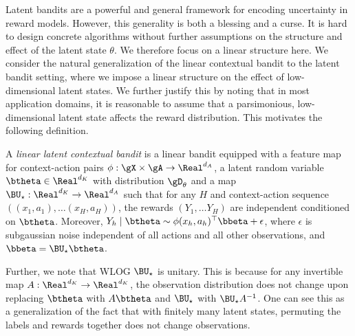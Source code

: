  
Latent bandits are a powerful and general framework for encoding uncertainty in reward models. However, this generality is both a blessing and a curse. It is hard to design concrete algorithms without further assumptions on the structure and effect of the latent state $\theta$. We therefore focus on a linear structure here. We consider the natural generalization of the linear contextual bandit to the latent bandit setting, where we impose a linear structure on the effect of low-dimensional latent states. We further justify this by noting that in most application domains, it is reasonable to assume that a parsimonious, low-dimensional latent state affects the reward distribution. This motivates the following definition.

\begin{definition}
    A \textit{linear latent contextual bandit} is a linear bandit equipped with a feature map for context-action pairs $\phi: \gX \times \gA \to \Real^{d_A}$, a latent random variable $\btheta \in \Real^{d_K}$ with distribution $\gD_\theta$ and a map $\BU_\star: \Real^{d_K} \to \Real^{d_A}$ such that for any $H$ and context-action sequence $((x_1, a_1), \dots (x_H, a_H))$, the rewards $(Y_1, \dots Y_H)$ are independent conditioned on $\btheta$. Moreover, $Y_h \mid \btheta \sim \phi(x_h,a_h)^\top \bbeta + \epsilon$, where $\epsilon$ is subgaussian noise independent of all actions and all other observations, and $\bbeta = \BU_\star \btheta$. 
    \label{defn:latent-linear-bandit}
\end{definition}
 
Further, we note that WLOG $\BU_\star$ is unitary. This is because for any invertible map $A: \Real^{d_K} \to \Real^{d_K}$, the observation distribution does not change upon replacing $\btheta$ with $A\btheta$ and $\BU_\star$ with $\BU_\star A^{-1}$. One can see this as a generalization of the fact that with finitely many latent states, permuting the labels and rewards together does not change observations. 

